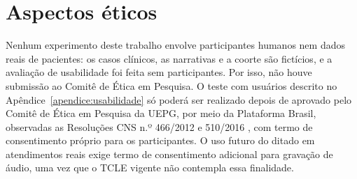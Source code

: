 \section{Aspectos éticos}
\label{sec:etica}

Nenhum experimento deste trabalho envolve participantes humanos nem dados reais de pacientes: os casos clínicos, as narrativas e a coorte são fictícios, e a avaliação de usabilidade foi feita sem participantes. Por isso, não houve submissão ao Comitê de Ética em Pesquisa. O teste com usuários descrito no Apêndice~\ref{apendice:usabilidade} só poderá ser realizado depois de aprovado pelo Comitê de Ética em Pesquisa da UEPG, por meio da Plataforma Brasil, observadas as Resoluções CNS n.º 466/2012 e 510/2016 \cite{cns466-2012,cns510-2016}, com termo de consentimento próprio para os participantes. O uso futuro do ditado em atendimentos reais exige termo de consentimento adicional para gravação de áudio, uma vez que o TCLE vigente não contempla essa finalidade.

